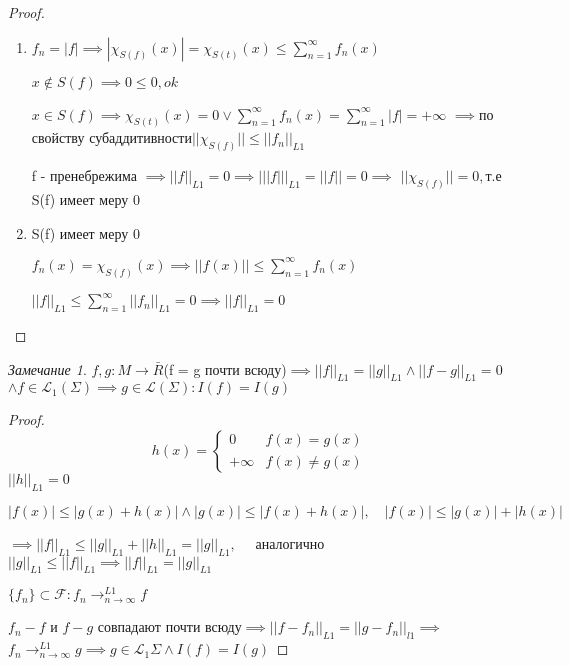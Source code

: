 \documentclass[a4paper, 12pt]{article}
\theoremstyle{definition}
\theoremstyle{remark}
\newtheorem*{remark}{Замечание}
\begin{document}
\begin{proof}
     \begin{enumerate}
          \item $f_n = |f|\implies |\chi_{S(f)}(x)| = \chi_{S(t)} (x)\leq \sum_{n = 1}^{\infty} f_n(x) $
          
          $x\notin S(f)\implies 0\leq 0, ok$

          $x\in S(f)\implies \chi_{S(t)}(x) = 0 \lor \sum_{n = 1}^{\infty} f_n(x) = \sum_{n = 1}^{\infty} |f| = +\infty $
          $\implies $по свойству субаддитивности$||\chi_{S(f)}||\leq ||f_n||_{L1}$

          f - пренебрежима $\implies ||f||_{L1} = 0\implies |||f|||_{L1} = ||f|| = 0\implies$
          $||\chi_{S(f)}|| = 0,$т.е S(f) имеет меру 0
          \item S(f) имеет меру 0
          
          $f_n(x)=\chi_{S(f)}(x)\implies ||f(x)||\leq \sum_{n = 1}^{\infty} f_n(x) $

          $||f||_{L1}\leq \sum_{n = 1}^{\infty} ||f_n||_{L1} = 0 \implies ||f||_{L1} = 0$
     \end{enumerate}
\end{proof}
\begin{remark}
     $f, g : M\to \bar{R}$(f = g почти всюду)$\implies ||f||_{L1} = ||g||_{L1}\land ||f-g||_{L1} = 0$
     $\land f\in \mathcal{L}_1(\Sigma)\implies g\in \mathcal{L} (\Sigma): I(f) = I(g)$
\end{remark}
\begin{proof}
     \begin{equation*}
          h(x) = 
          \begin{cases}
               0 & \text{$f(x) = g(x)$}\\
               \text{$+\infty$} & \text{$f(x)\neq g(x)$}
          \end{cases}
     \end{equation*}
     $||h||_{L1} = 0$

     $|f(x)|\leq |g(x)+h(x)|\land |g(x)|\leq |f(x) +h(x)|, \quad |f(x)|\leq |g(x)|+|h(x)|$

     $\implies ||f||_{L1}\leq ||g||_{L1} +||h||_{L1} = ||g||_{L1}, \quad$ аналогично $||g||_{L1}\leq ||f||_{L1}\implies ||f||_{L1}=||g||_{L1}$

     $\{f_n\}\subset\mathcal{F} : f_n\to^{L1}_{n\to\infty} f$

     $f_n - f$ и $f - g$ совпадают почти всюду$\implies ||f-f_n||_{L1} = ||g - f_n||_{l1}\implies$
     $f_n\to^{L1}_{n\to\infty} g\implies g\in \mathcal{L}_1{\Sigma} \land  I(f) = I(g)$


\end{proof}
\end{document}

